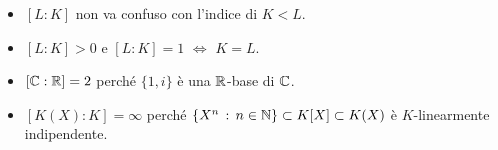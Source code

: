 \begin{osse}
\begin{itemize}
\item $[L:K]$ non va confuso con l'indice di $K<L$.
\item $[L:K]>0$ e $[L:K]=1$ $\iff$ $K=L$.
\end{itemize}
\end{osse}
\begin{esem}
\begin{itemize}
\item $[\mathbb{C}:\mathbb{R}]=2$ perché $\{1,i\}$ è una $\mathbb{R}$-base di $\mathbb{C}$.
\item $[K(X):K]=\infty$ perché $\{X^n\,:\, n\in\mathbb{N}\}\subset K[X]\subset K(X)$ è $K$-linearmente indipendente.
\end{itemize}
\end{esem}



%
%



